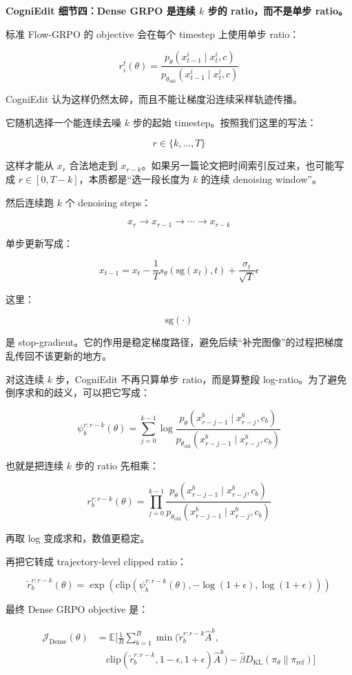 \textbf{CogniEdit 细节四：Dense GRPO 是连续 $k$ 步的 ratio，而不是单步 ratio。}

标准 Flow-GRPO 的 objective 会在每个 timestep 上使用单步 ratio：

\[
r_i^t(\theta)
=
\frac{
p_\theta(x_{t-1}^i\mid x_t^i,c)
}{
p_{\theta_\text{old}}(x_{t-1}^i\mid x_t^i,c)
}
\]

CogniEdit 认为这样仍然太碎，而且不能让梯度沿连续采样轨迹传播。

它随机选择一个能连续去噪 $k$ 步的起始 timestep。按照我们这里的写法：

\[
r
\in
\{k,\ldots,T\}
\]

这样才能从 $x_r$ 合法地走到 $x_{r-k}$。如果另一篇论文把时间索引反过来，也可能写成 $r\in[0,T-k]$，本质都是“选一段长度为 $k$ 的连续 denoising window”。

然后连续跑 $k$ 个 denoising steps：

\[
x_r
\rightarrow
x_{r-1}
\rightarrow
\cdots
\rightarrow
x_{r-k}
\]

单步更新写成：

\[
x_{t-1}
=
x_t
-
\frac{1}{T}
s_\theta(\text{sg}(x_t),t)
+
\frac{\sigma_t}{\sqrt{T}}\epsilon
\]

这里：

\[
\text{sg}(\cdot)
\]

是 stop-gradient。它的作用是稳定梯度路径，避免后续“补完图像”的过程把梯度乱传回不该更新的地方。

对这连续 $k$ 步，CogniEdit 不再只算单步 ratio，而是算整段 log-ratio。为了避免倒序求和的歧义，可以把它写成：

\[
\psi_b^{r:r-k}(\theta)
=
\sum_{j=0}^{k-1}
\log
\frac{
p_\theta(x_{r-j-1}^{b}\mid x_{r-j}^{b},c_b)
}{
p_{\theta_\text{old}}(x_{r-j-1}^{b}\mid x_{r-j}^{b},c_b)
}
\]

也就是把连续 $k$ 步的 ratio 先相乘：

\[
r_b^{r:r-k}(\theta)
=
\prod_{j=0}^{k-1}
\frac{
p_\theta(x_{r-j-1}^{b}\mid x_{r-j}^{b},c_b)
}{
p_{\theta_\text{old}}(x_{r-j-1}^{b}\mid x_{r-j}^{b},c_b)
}
\]

再取 log 变成求和，数值更稳定。

再把它转成 trajectory-level clipped ratio：

\[
\tilde{r}_b^{r:r-k}(\theta)
=
\exp
\left(
\text{clip}
\left(
\psi_b^{r:r-k}(\theta),
-\log(1+\epsilon),
\log(1+\epsilon)
\right)
\right)
\]

最终 Dense GRPO objective 是：

\[
\begin{aligned}
\mathcal{J}_\text{Dense}(\theta)
&=
\mathbb{E}
\Bigg[
\frac{1}{B}
\sum_{b=1}^{B}
\min
\Big(
\tilde{r}_b^{r:r-k}\hat{A}^{b},
\\
&\quad
\text{clip}
\left(
\tilde{r}_b^{r:r-k},
1-\epsilon,
1+\epsilon
\right)
\hat{A}^{b}
\Big)
-
\hat{\beta}
D_\text{KL}
(\pi_\theta\|\pi_\text{ref})
\Bigg]
\end{aligned}
\]

